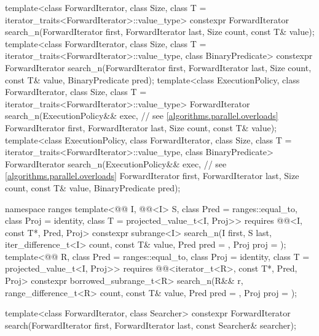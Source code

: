 \begin{codeblock}
{  template<class ForwardIterator, class Size,
           class T = iterator_traits<ForwardIterator>::value_type>
    constexpr ForwardIterator
      search_n(ForwardIterator first, ForwardIterator last,
               Size count, const T& value);
  template<class ForwardIterator, class Size,
           class T = iterator_traits<ForwardIterator>::value_type, class BinaryPredicate>
    constexpr ForwardIterator
      search_n(ForwardIterator first, ForwardIterator last,
               Size count, const T& value, BinaryPredicate pred);
  template<class ExecutionPolicy, class ForwardIterator, class Size,
           class T = iterator_traits<ForwardIterator>::value_type>
    ForwardIterator
      search_n(ExecutionPolicy&& exec,                          // see \ref{algorithms.parallel.overloads}
               ForwardIterator first, ForwardIterator last,
               Size count, const T& value);
  template<class ExecutionPolicy, class ForwardIterator, class Size,
           class T = iterator_traits<ForwardIterator>::value_type, class BinaryPredicate>
    ForwardIterator
      search_n(ExecutionPolicy&& exec,                          // see \ref{algorithms.parallel.overloads}
               ForwardIterator first, ForwardIterator last,
               Size count, const T& value,
               BinaryPredicate pred);

  namespace ranges {
    template<@@ I, @@<I> S,
             class Pred = ranges::equal_to, class Proj = identity,
             class T = projected_value_t<I, Proj>>
      requires @@<I, const T*, Pred, Proj>
      constexpr subrange<I>
        search_n(I first, S last, iter_difference_t<I> count,
                 const T& value, Pred pred = {}, Proj proj = {});
    template<@@ R, class Pred = ranges::equal_to,
             class Proj = identity, class T = projected_value_t<I, Proj>>
      requires @@<iterator_t<R>, const T*, Pred, Proj>
      constexpr borrowed_subrange_t<R>
        search_n(R&& r, range_difference_t<R> count,
                 const T& value, Pred pred = {}, Proj proj = {});
  }

  template<class ForwardIterator, class Searcher>
    constexpr ForwardIterator
      search(ForwardIterator first, ForwardIterator last, const Searcher& searcher);

}
\end{codeblock}
